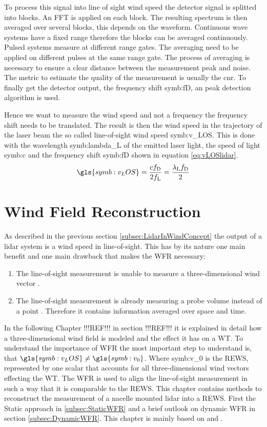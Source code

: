 \noindent To process this signal into line of sight wind speed the detector signal is splitted into blocks. An \gls{FFT} is applied on each block. The resulting spectrum is then averaged over several blocks, this depends on the waveform. Continuous wave systems have a fixed range therefore the blocks can be averaged continuously. Pulsed systems measure at different range gates. The averaging need to be applied on different pulses at the same range gate. The process of averaging is necessary to ensure a clear distance between the measurement peak and noise. The metric to estimate the quality of the measurement is usually the \gls{cnr}. To finally get the detector output, the frequency shift \gls{symb:fD}, an peak detection algorithm is used.  

\noindent Hence we want to measure the wind speed and not a frequency the frequency shift needs to be translated. The result is then the wind speed in the trajectory of the laser beam the so called line-of-sight wind speed \gls{symb:v_LOS}. This is done with the wavelength \gls{symb:lambda_L} of the emitted laser light, the speed of light \gls{symb:c} and the frequency shift \gls{symb:fD} shown in equation \ref{eq:vLOSlidar}.
\begin{equation}
	\gls{symb:v_LOS} =  \frac{c f_\textnormal{D}}{2f_\textnormal{L}} = \frac{\lambda_\textnormal{L} f_\textnormal{D}}{2}
	\label{eq:vLOSlidar}	
\end{equation} 

\section{Wind Field Reconstruction}\label{sec:WindFieldReconstruction}
As described in the previous section \ref{subsec:LidarInWindConcept} the output of a \gls{lidar} system is a wind speed in line-of-sight. This has by its nature one main benefit and one main drawback that makes the \gls{WFR} necessary:
\begin{enumerate}
	\item The line-of-sight measurement is unable to measure a three-dimensional wind vector \cite{Schlipf2015}.
	\item The line-of-sight measurement is already measuring a probe volume instead of a point \cite{Schlipf2015}. Therefore it contains information averaged over space and time. 
\end{enumerate}
In the following Chapter !!!REF!!! in section !!!REF!!! it is explained in detail how a three-dimensional wind field is modeled and the effect it has on a \gls{WT}. To understand the importance of \gls{WFR} the most important step to understand is, that $\gls{symb:v_LOS} \neq \gls{symb:v_0}$. Where \gls{symb:v_0} is the \gls{REWS}, represented by one scalar that accounts for all three-dimensional wind vectors effecting the \gls{WT}. The \gls{WFR} is used to align the line-of-sight measurement in such a way that it is comparable to the \gls{REWS}. 
This chapter contains methods to reconstruct the measurement of a nacelle mounted \gls{lidar} into a \gls{REWS}. First the Static approach in \ref{subsec:StaticWFR} and a brief outlook on dynamic \gls{WFR} in section \ref{subsec:DynamicWFR}. This chapter is mainly based on \cite{Schlipf2011} and \cite{Schlipf2012}.

